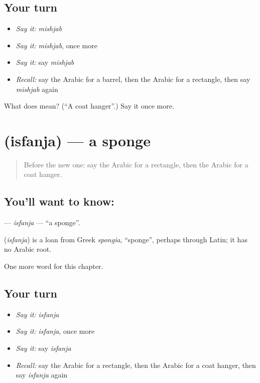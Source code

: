 \subsection*{Your turn}
\begin{itemize}
\raggedright
  \item \emph{Say it:} \emph{mishjab}
  \item \emph{Say it:} \emph{mishjab}, once more
  \item \emph{Say it:} say \emph{mishjab}
  \item \emph{Recall:} say the Arabic for a barrel, then the Arabic for a rectangle, then say \emph{mishjab} again
\end{itemize}

\begin{tcolorbox}[breakable,colback=teal!4,colframe=teal!35!black,title={Before you move on}]
What does  mean? (\textquotedblleft{}A coat hanger\textquotedblright{}.) Say it once more.
\end{tcolorbox}
\section[\texorpdfstring{\ar{إسفنجة} (isfanja)}{إسفنجة (isfanja)}]{ (isfanja) — a sponge}

\label{lesson:AR-C279-isfanja}



\begin{quote}
Before the new one: say the Arabic for a rectangle, then the Arabic for a coat hanger.
\end{quote}

\subsection*{You'll want to know: }
\textbf{} — \emph{isfanja} — \textquotedblleft{}a sponge\textquotedblright{}.

\begin{cousinweb}
\textbf{} (\emph{isfanja}) is a loan from Greek \emph{spongia}, \textquotedblleft{}sponge\textquotedblright{}, perhaps through Latin; it has no Arabic root.
\end{cousinweb}

\begin{grammarlens}[title={What you've built}]
One more word for this chapter.
\end{grammarlens}

\subsection*{Your turn}
\begin{itemize}
\raggedright
  \item \emph{Say it:} \emph{isfanja}
  \item \emph{Say it:} \emph{isfanja}, once more
  \item \emph{Say it:} say \emph{isfanja}
  \item \emph{Recall:} say the Arabic for a rectangle, then the Arabic for a coat hanger, then say \emph{isfanja} again
\end{itemize}


